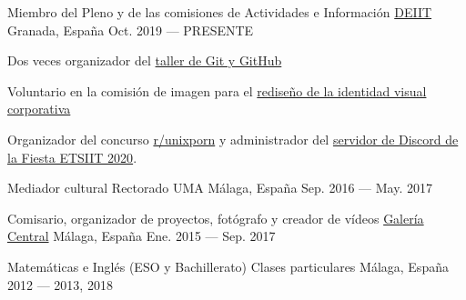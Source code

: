 
\begin{cventries}

\cventry%
	{Miembro del Pleno y de las comisiones de Actividades e Información} %
	{\href{https://deiit.ugr.es/}{DEIIT}} %
	{Granada, España} %
	{Oct. 2019 --- PRESENTE} %
	{%
		\begin{cvitems} %
			\item {Dos veces organizador del \href{https://github.com/DEIIT/taller-git-y-github}{taller de Git y GitHub}}
			\item {Voluntario en la comisión de imagen para el \href{https://deiit.ugr.es/transparencia/\#manual-de-identidad-visual-corporativa}{rediseño de la identidad visual corporativa}}
			\item {Organizador del concurso \href{https://www.reddit.com/r/unixporn/}{r/unixporn} y administrador del \href{https://deiit.ugr.es/fiesta_2020/}{servidor de Discord de la Fiesta ETSIIT 2020}.}
		\end{cvitems}
	}

\cventry%
	{Mediador cultural} %
	{Rectorado UMA} %
	{Málaga, España} %
	{Sep. 2016 --- May. 2017} %
	{}

\cventry%
	{Comisario, organizador de proyectos, fotógrafo y creador de vídeos}
	{\href{https://twitter.com/galeriacentral}{Galería Central}}
	{Málaga, España}
	{Ene. 2015 --- Sep. 2017}
	{}

\cventry%
	{Matemáticas e Inglés (ESO y Bachillerato)}
	{Clases particulares}
	{Málaga, España}
	{2012 --- 2013, 2018}
	{}

\end{cventries}
